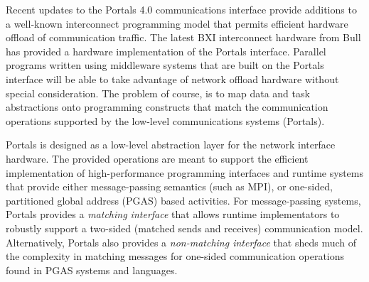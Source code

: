 



%



Recent updates to the Portals 4.0 communications interface provide
additions to a well-known interconnect programming model that permits
efficient hardware offload of communication traffic. The latest BXI
interconnect hardware from Bull has provided a hardware implementation
of the Portals interface.  Parallel programs written using middleware
systems that are built on the Portals interface will be able to take
advantage of network offload hardware without special consideration. 
The problem of course, is to map data and task abstractions onto
programming constructs that match the communication operations
supported by the low-level communications systems (Portals). 

Portals is designed as a low-level abstraction layer for the network
interface hardware. The provided operations are meant to support the
efficient implementation of high-performance programming interfaces
and runtime systems that provide either message-passing semantics
(such as MPI), or one-sided, partitioned global address (PGAS) based
activities. For message-passing systems, Portals provides a {\em
  matching interface} that allows runtime implementators to robustly
support a two-sided (matched sends and receives) communication
model. Alternatively, Portals also provides a {\em non-matching
  interface} that sheds much of the complexity in matching messages
for one-sided communication operations found in PGAS systems and
languages.

